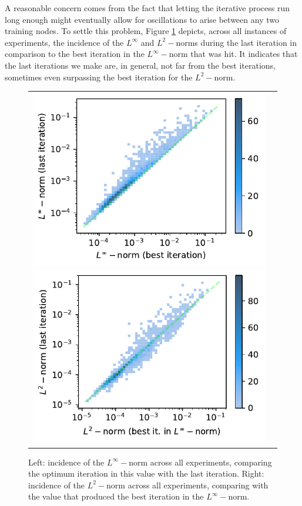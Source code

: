 \documentclass[12pt]{report} %
\begin{document}
A reasonable concern comes from the fact that letting the iterative process run long enough might eventually allow for oscillations to arise between any two training nodes. To settle this problem, Figure \ref{fig:u2-results-incidence-l-norms} depicts, across all instances of experiments, the incidence of the $L^\infty$ and $L^2-$norms during the last iteration in comparison to the best iteration in the $L^\infty-$norm that was hit. It indicates that the last iterations we make are, in general, not far from the best iterations, sometimes even surpassing the best iteration for the $L^2-$norm.

\begin{figure}[h]
  \hspace*{-2cm}
  \begin{tabular}{cc}
    \includegraphics[width=.6\textwidth]{imagenes/experiments/1d/statistical_1d_full_scheduler_interpolation/incidence_of_linf.pdf}
  \includegraphics[width=.6\textwidth]{imagenes/experiments/1d/statistical_1d_full_scheduler_interpolation/incidence_of_l2.pdf}
  \end{tabular}
  \caption{Left: incidence of the $L^\infty-$norm across all experiments, comparing the optimum iteration in this value with the last iteration. Right: incidence of the $L^2-$norm across all experiments, comparing with the value that produced the best iteration in the $L^\infty-$norm.}
  \label{fig:u2-results-incidence-l-norms}
\end{figure}
\end{document}
